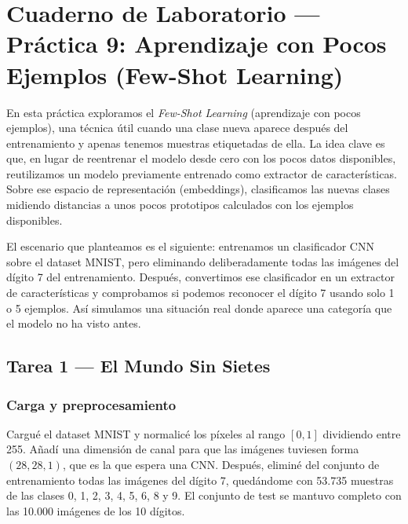 \documentclass[../../__memoria.tex]{subfiles}
\begin{document}
\standalonecover
\pagestyle{cuerpo}

\graphicspath{{\subfix{../../Imagenes/}}{../../Imagenes/}{\subfix{img/}}{img/}}

\chapter[Práctica 9: Few-Shot Learning]{Cuaderno de Laboratorio --- Práctica 9: Aprendizaje con Pocos Ejemplos (Few-Shot Learning)}

En esta práctica exploramos el \textit{Few-Shot Learning} (aprendizaje con pocos ejemplos), una técnica útil cuando una clase nueva aparece después del entrenamiento y apenas tenemos muestras etiquetadas de ella. La idea clave es que, en lugar de reentrenar el modelo desde cero con los pocos datos disponibles, reutilizamos un modelo previamente entrenado como extractor de características. Sobre ese espacio de representación (embeddings), clasificamos las nuevas clases midiendo distancias a unos pocos prototipos calculados con los ejemplos disponibles.

El escenario que planteamos es el siguiente: entrenamos un clasificador CNN sobre el dataset MNIST, pero eliminando deliberadamente todas las imágenes del dígito 7 del entrenamiento. Después, convertimos ese clasificador en un extractor de características y comprobamos si podemos reconocer el dígito 7 usando solo 1 o 5 ejemplos. Así simulamos una situación real donde aparece una categoría que el modelo no ha visto antes.

\section[Tarea 1: Clasificador Base]{Tarea 1 --- El Mundo Sin Sietes}

\subsection{Carga y preprocesamiento}

Cargué el dataset MNIST y normalicé los píxeles al rango $[0, 1]$ dividiendo entre 255. Añadí una dimensión de canal para que las imágenes tuviesen forma $(28, 28, 1)$, que es la que espera una CNN. Después, eliminé del conjunto de entrenamiento todas las imágenes del dígito 7, quedándome con 53.735 muestras de las clases 0, 1, 2, 3, 4, 5, 6, 8 y 9. El conjunto de test se mantuvo completo con las 10.000 imágenes de los 10 dígitos.
\end{document}
